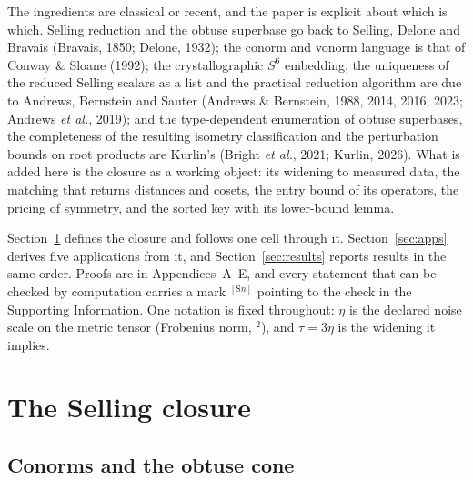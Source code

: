 \documentclass[preprint,pdf]{iucr}          %
\newcommand{\Ang}{\text{\AA}}
\begin{document}
The ingredients are classical or recent, and the paper is explicit about which is which. Selling reduction and the obtuse superbase go back to Selling, Delone and Bravais (Bravais, 1850; Delone, 1932); the conorm and vonorm language is that of Conway \& Sloane (1992); the crystallographic $S^6$ embedding, the uniqueness of the reduced Selling scalars as a list and the practical reduction algorithm are due to Andrews, Bernstein and Sauter (Andrews \& Bernstein, 1988, 2014, 2016, 2023; Andrews \emph{et al.}, 2019); and the type-dependent enumeration of obtuse superbases, the completeness of the resulting isometry classification and the perturbation bounds on root products are Kurlin's (Bright \emph{et al.}, 2021; Kurlin, 2026). What is added here is the closure as a working object: its widening to measured data, the matching that returns distances and cosets, the entry bound of its operators, the pricing of symmetry, and the sorted key with its lower-bound lemma.

Section~\ref{sec:closure-def} defines the closure and follows one cell through it. Section~\ref{sec:apps} derives five applications from it, and Section~\ref{sec:results} reports results in the same order. Proofs are in Appendices~A--E, and every statement that can be checked by computation carries a mark $^{[\mathrm{S}n]}$ pointing to the check in the Supporting Information. One notation is fixed throughout: $\eta$ is the declared noise scale on the metric tensor (Frobenius norm, \Ang$^2$), and $\tau=3\eta$ is the widening it implies.

\section{The Selling closure}
\label{sec:closure-def}

\subsection{Conorms and the obtuse cone}
\label{sec:conorms}
\end{document}

